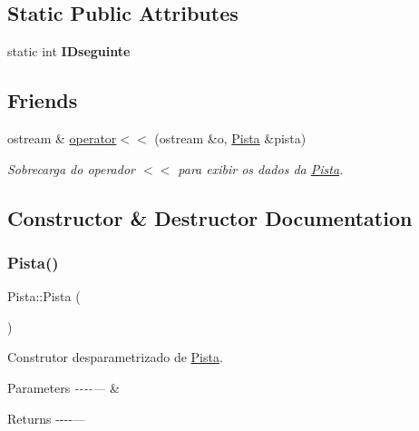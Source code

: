 \subsection*{Static Public Attributes}
\begin{DoxyCompactItemize}
\item 
\mbox{\label{classPista_a0f9bf5f71209fbc42e617d766dec160f}} 
static int {\bfseries I\+Dseguinte}
\end{DoxyCompactItemize}
\subsection*{Friends}
\begin{DoxyCompactItemize}
\item 
ostream \& \hyperlink{classPista_ab32f44295a5f3b212cd8830439cad5fc}{operator$<$$<$} (ostream \&o, \hyperlink{classPista}{Pista} \&pista)
\begin{DoxyCompactList}\small\item\em Sobrecarga do operador $<$$<$ para exibir os dados da \hyperlink{classPista}{Pista}. \end{DoxyCompactList}\end{DoxyCompactItemize}


\subsection{Constructor \& Destructor Documentation}
\mbox{\label{classPista_a0ac128160ae609df4adcc5a7a41213ba}} 
\subsubsection{\texorpdfstring{Pista()}{Pista()}\hspace{0.1cm}{\footnotesize\ttfamily [1/2]}}
{\footnotesize\ttfamily Pista\+::\+Pista (\begin{DoxyParamCaption}{ }\end{DoxyParamCaption})}



Construtor desparametrizado de \hyperlink{classPista}{Pista}. 


\begin{DoxyParams}{Parameters}
{\em -\/-\/-\/-\/---} & \\
\hline
\end{DoxyParams}
\begin{DoxyReturn}{Returns}
-\/-\/-\/-\/--- 
\end{DoxyReturn}
\mbox{\label{classPista_a9ce728f6572e9694bcdc657d7331ca4a}} 
